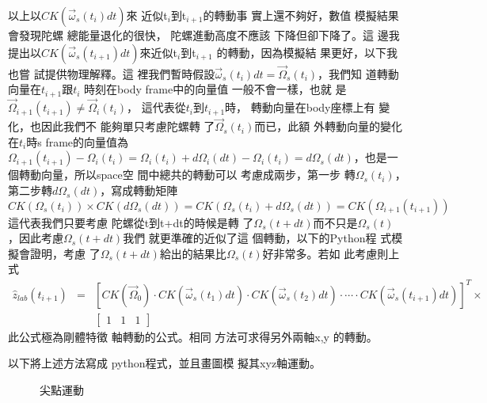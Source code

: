\documentclass[12pt,a4paper]{article}
\begin{document}
以上以$CK\left( \vec{\omega}_{s}(t_{i})dt\right) $來%
近似t$_{i}$到t$_{i+1}$的轉動事%
實上還不夠好，數值%
模擬結果會發現陀螺%
總能量退化的很快，%
陀螺進動高度不應該%
下降但卻下降了。這%
邊我提出以$CK\left( \vec{\omega}%
_{s}(t_{i+1})dt\right) $來近似t$_{i}$到t$_{i+1}$%
的轉動，因為模擬結%
果更好，以下我也嘗%
試提供物理解釋。這%
裡我們暫時假設$\vec{\omega}%
_{s}(t_{i})dt=\vec{\Omega}_{s}(t_{i})$，我們知%
道轉動向量在$t_{i+1}$跟$t_{i}$%
時刻在body frame中的向量值%
一般不會一樣，也就%
是$\vec{\Omega}_{i+1}(t_{i+1})\neq \vec{\Omega}_{i}(t_{i})$，%
這代表從$t_{i}$到$t_{i+1}$時，%
轉動向量在body座標上有%
變化，也因此我們不%
能夠單只考慮陀螺轉%
了$\vec{\Omega}_{s}(t_{i})$而已，此額%
外轉動向量的變化在$%
t_{i}$時s frame的向量值為$\Omega
_{i+1}(t_{i+1})-\Omega _{i}(t_{i})=\Omega _{i}(t_{i})+d\Omega
_{i}(dt)-\Omega _{i}(t_{i})=d\Omega _{s}(dt)$，也是一%
個轉動向量，所以space空%
間中總共的轉動可以%
考慮成兩步，第一步%
轉$\Omega _{s}(t_{i})$，第二步轉$d\Omega
_{s}(dt)$，寫成轉動矩陣%
\begin{equation}
CK(\Omega _{s}(t_{i}))\times CK(d\Omega _{s}(dt))=CK(\Omega
_{s}(t_{i})+d\Omega _{s}(dt))=CK(\Omega _{i+1}(t_{i+1}))
\end{equation}%
這代表我們只要考慮%
陀螺從t到t+dt的時候是轉%
了$\Omega _{s}(t+dt)$而不只是$\Omega _{s}(t)$%
，因此考慮$\Omega _{s}(t+dt)$我們%
就更準確的近似了這%
個轉動，以下的Python程%
式模擬會證明，考慮%
了$\Omega _{s}(t+dt)$給出的結果比$%
\Omega _{s}(t)$好非常多。若如%
此考慮則上式%
\begin{eqnarray*}
\hat{z}_{lab}\left( t_{i+1}\right) &=&\left[ CK\left( \vec{\Omega}%
_{0}\right) \cdot CK\left( \vec{\omega}_{s}\left( t_{1}\right) dt\right)
\cdot CK\left( \vec{\omega}_{s}\left( t_{2}\right) dt\right) \cdot \cdots
\cdot CK\left( \vec{\omega}_{s}\left( t_{i+1}\right) dt\right) \right]
^{T}\times \\
&&\left[ 
\begin{array}{ccc}
1 & 1 & 1%
\end{array}%
\right]
\end{eqnarray*}%
此公式極為剛體特徵%
軸轉動的公式。相同%
方法可求得另外兩軸x,y%
的轉動。

以下將上述方法寫成%
python程式，並且畫圖模%
擬其xyz軸運動。

\begin{figure}[th]
\caption{尖點運動}
\begin{center}
\end{center}
\end{figure}
\end{document}
